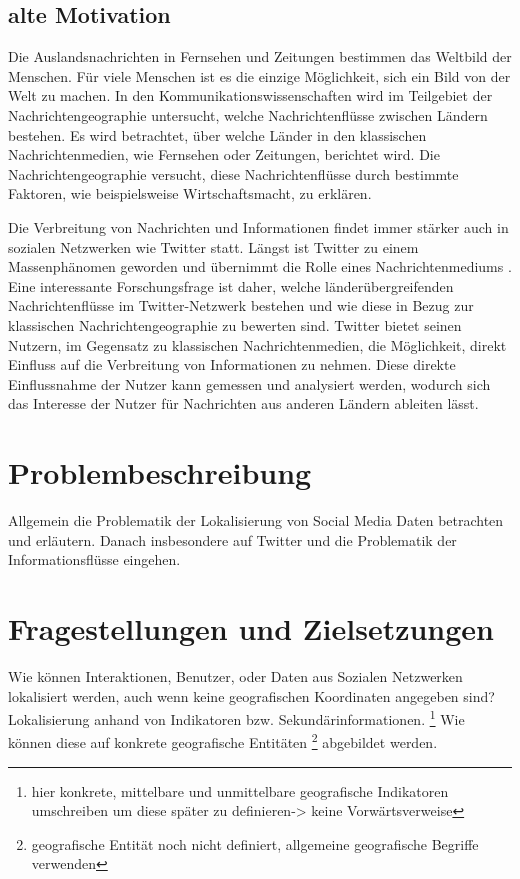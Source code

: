 	\subsection{alte Motivation} 
		Die Auslandsnachrichten in Fernsehen und Zeitungen bestimmen das Weltbild der Menschen.
		Für viele Menschen ist es die einzige Möglichkeit, sich ein Bild von der Welt zu machen. 
		In den Kommunikationswissenschaften wird im Teilgebiet der Nachrichtengeographie untersucht, welche Nachrichtenflüsse zwischen Ländern bestehen.
		Es wird betrachtet, über welche Länder in den klassischen Nachrichtenmedien, wie Fernsehen oder Zeitungen, berichtet wird. 
		Die Nachrichtengeographie versucht, diese Nachrichtenflüsse durch bestimmte Faktoren, wie beispielsweise Wirtschaftsmacht, zu erklären. 

		Die Verbreitung von Nachrichten und Informationen findet immer stärker auch in sozialen Netzwerken wie Twitter statt. 
		Längst ist Twitter zu einem Massenphänomen geworden und übernimmt die Rolle eines Nachrichtenmediums \cite{Petrovic2013}.
		Eine interessante Forschungsfrage ist daher, welche län\-der\-ü\-ber\-grei\-fen\-den Nachrichtenflüsse im Twit\-ter-Netz\-werk bestehen und wie diese in Bezug zur klassischen Nachrichtengeographie zu bewerten sind. 
		Twitter bietet seinen Nutzern, im Gegensatz zu klassischen Nachrichtenmedien, die Möglichkeit, direkt Einfluss auf die Verbreitung von Informationen zu nehmen. Diese direkte Einflussnahme der Nutzer kann gemessen und analysiert werden, wodurch sich das Interesse der Nutzer für Nachrichten aus anderen Ländern ableiten lässt.

	\section{Problembeschreibung} 
	Allgemein die Problematik der Lokalisierung von Social Media Daten betrachten und erläutern.
	Danach insbesondere auf Twitter und die Problematik der Informationsflüsse eingehen.

	\section{Fragestellungen und Zielsetzungen}
	Wie können Interaktionen, Benutzer, oder Daten aus Sozialen Netzwerken lokalisiert werden, auch wenn keine geografischen Koordinaten angegeben sind? 
	Lokalisierung anhand von Indikatoren bzw. Sekundärinformationen.
	\footnote{hier konkrete, mittelbare und unmittelbare geografische Indikatoren umschreiben um diese später zu definieren-> keine Vorwärtsverweise} 
	Wie können diese auf konkrete geografische Entitäten \footnote{geografische Entität noch nicht definiert, allgemeine geografische Begriffe verwenden}  abgebildet werden. 

